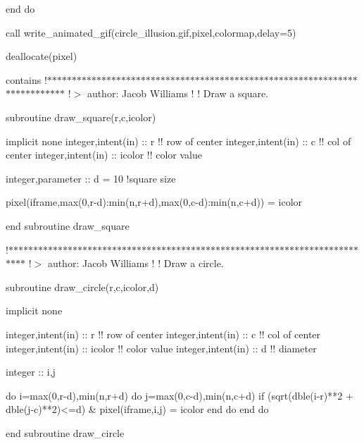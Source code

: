 end do

call write\+\_\+animated\+\_\+gif(\textquotesingle{}circle\+\_\+illusion.\+gif\textquotesingle{},pixel,colormap,delay=5)

deallocate(pixel)

contains !$\ast$$\ast$$\ast$$\ast$$\ast$$\ast$$\ast$$\ast$$\ast$$\ast$$\ast$$\ast$$\ast$$\ast$$\ast$$\ast$$\ast$$\ast$$\ast$$\ast$$\ast$$\ast$$\ast$$\ast$$\ast$$\ast$$\ast$$\ast$$\ast$$\ast$$\ast$$\ast$$\ast$$\ast$$\ast$$\ast$$\ast$$\ast$$\ast$$\ast$$\ast$$\ast$$\ast$$\ast$$\ast$$\ast$$\ast$$\ast$$\ast$$\ast$$\ast$$\ast$$\ast$$\ast$$\ast$$\ast$$\ast$$\ast$$\ast$$\ast$$\ast$$\ast$$\ast$$\ast$$\ast$$\ast$$\ast$$\ast$$\ast$$\ast$$\ast$$\ast$$\ast$$\ast$$\ast$ !$>$ author\+: Jacob Williams ! ! Draw a square. \begin{DoxyVerb}subroutine draw_square(r,c,icolor)

implicit none
integer,intent(in) :: r      !! row of center
integer,intent(in) :: c      !! col of center
integer,intent(in) :: icolor !! color value

integer,parameter :: d = 10 !square size

pixel(iframe,max(0,r-d):min(n,r+d),max(0,c-d):min(n,c+d)) = icolor

end subroutine draw_square
\end{DoxyVerb}
 !$\ast$$\ast$$\ast$$\ast$$\ast$$\ast$$\ast$$\ast$$\ast$$\ast$$\ast$$\ast$$\ast$$\ast$$\ast$$\ast$$\ast$$\ast$$\ast$$\ast$$\ast$$\ast$$\ast$$\ast$$\ast$$\ast$$\ast$$\ast$$\ast$$\ast$$\ast$$\ast$$\ast$$\ast$$\ast$$\ast$$\ast$$\ast$$\ast$$\ast$$\ast$$\ast$$\ast$$\ast$$\ast$$\ast$$\ast$$\ast$$\ast$$\ast$$\ast$$\ast$$\ast$$\ast$$\ast$$\ast$$\ast$$\ast$$\ast$$\ast$$\ast$$\ast$$\ast$$\ast$$\ast$$\ast$$\ast$$\ast$$\ast$$\ast$$\ast$$\ast$$\ast$$\ast$$\ast$ !$>$ author\+: Jacob Williams ! ! Draw a circle. \begin{DoxyVerb}subroutine draw_circle(r,c,icolor,d)

implicit none

integer,intent(in) :: r      !! row of center
integer,intent(in) :: c      !! col of center
integer,intent(in) :: icolor !! color value
integer,intent(in) :: d      !! diameter

integer :: i,j

do i=max(0,r-d),min(n,r+d)
    do j=max(0,c-d),min(n,c+d)
        if (sqrt(dble(i-r)**2 + dble(j-c)**2)<=d) &
            pixel(iframe,i,j) = icolor
    end do
end do

end subroutine draw_circle
\end{DoxyVerb}
